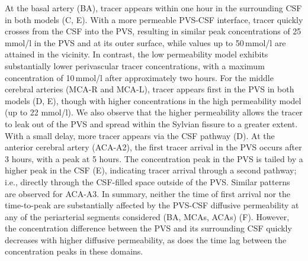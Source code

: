 \documentclass[fleqn,10pt]{wlscirep}
\begin{document}
At the basal artery (BA), tracer appears within one hour in the
surrounding CSF in both models (C,
E). With a more permeable PVS-CSF interface, tracer quickly crosses
from the CSF into the PVS, resulting in similar peak concentrations of
25\,mmol/l in the PVS and at its outer surface, while values up to
50\,mmol/l are attained in the vicinity. In contrast, the low
permeability model exhibits substantially lower perivascular tracer
concentrations, with a maximum concentration of 10\,mmol/l after
approximately two hours.
For the middle cerebral arteries (MCA-R and MCA-L), tracer appears
first in the PVS in both models (D, E),
though with higher concentrations in the high permeability model (up
to 22 mmol/l). We also observe that the higher permeability allows the
tracer to leak out of the PVS and spread within the Sylvian fissure to
a greater extent. With a small delay, more tracer appears via the CSF
pathway (D). At the anterior cerebral
artery (ACA-A2), the first tracer arrival in the PVS occurs after 3
hours, with a peak at 5 hours. The concentration peak in the PVS is
tailed by a higher peak in the CSF (E),
indicating tracer arrival through a second pathway; i.e., directly
through the CSF-filled space outside of the PVS. Similar patterns are
observed for ACA-A3.
%
In summary, neither the time of first arrival nor the time-to-peak are
substantially affected by the PVS-CSF diffusive permeability at any of
the periarterial segments considered (BA, MCAs, ACAs)
(F). However, the concentration
difference between the PVS and its surrounding CSF quickly decreases
with higher diffusive permeability, as does the time lag between the
concentration peaks in these domains.
\end{document}
